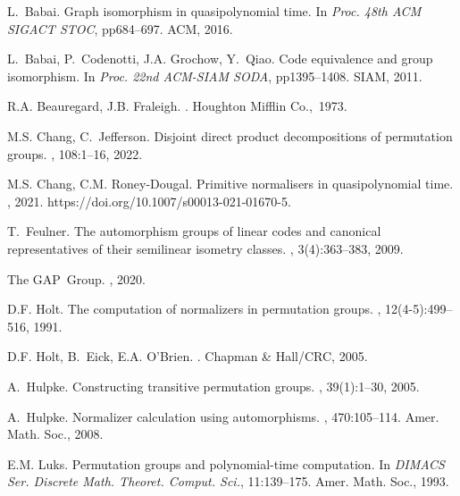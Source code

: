 \documentclass[11pt,a4paper]{article}
\theoremstyle{definition}
\theoremstyle{remark}
\begin{document}

\begin{thebibliography}{10}

L.~Babai.
\newblock Graph isomorphism in quasipolynomial time.
\newblock In {\em {P}roc. 48th {ACM} {SIGACT} {STOC}}, pp684--697. ACM, 2016.

L.~Babai, P.~Codenotti, J.A. Grochow, Y.~Qiao.
\newblock Code equivalence and group isomorphism.
\newblock In {\em {P}roc. 22nd {ACM}-{SIAM} {SODA}}, pp1395--1408. SIAM, 2011.

R.A. Beauregard, J.B. Fraleigh.
.
\newblock Houghton Mifflin Co.,~1973.

M.S. Chang, C.~Jefferson.
\newblock Disjoint direct product decompositions of permutation groups.
, 108:1--16, 2022.

M.S. Chang, C.M. Roney-Dougal.
\newblock Primitive normalisers in quasipolynomial time.
, 2021. https://doi.org/10.1007/s00013-021-01670-5.

T.~Feulner.
\newblock The automorphism groups of linear codes and canonical representatives of their semilinear isometry classes.
, 3(4):363--383, 2009.

The GAP~Group.
,
  2020.

D.F. Holt.
\newblock The computation of normalizers in permutation groups.
, 12(4-5):499--516, 1991.

D.F. Holt, B.~Eick, E.A. O'Brien.
.
\newblock Chapman \& Hall/CRC, 2005.

A.~Hulpke.
\newblock Constructing transitive permutation groups.
, 39(1):1--30, 2005.

A.~Hulpke.
\newblock Normalizer calculation using automorphisms.
, 470:105--114. Amer. Math. Soc., 2008.

E.M. Luks.
\newblock Permutation groups and polynomial-time computation.
\newblock In {\em DIMACS Ser. Discrete Math. Theoret. Comput. Sci.}, 11:139--175. Amer. Math. Soc.,
  1993.


\end{thebibliography}
\end{document}
